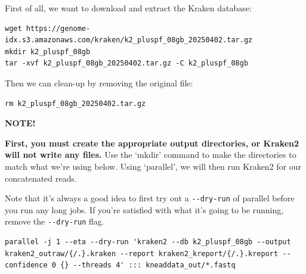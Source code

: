 \documentclass[
]{book}
\newenvironment{greenbox}{
  \definecolor{shadecolor}{RGB}{141, 181, 128}
  \color{white}
  \begin{shaded}}
 {\end{shaded}}
\begin{document}
First of all, we want to download and extract the Kraken database:

\begin{verbatim}
wget https://genome-idx.s3.amazonaws.com/kraken/k2_pluspf_08gb_20250402.tar.gz
mkdir k2_pluspf_08gb
tar -xvf k2_pluspf_08gb_20250402.tar.gz -C k2_pluspf_08gb
\end{verbatim}

Then we can clean-up by removing the original file:

\begin{verbatim}
rm k2_pluspf_08gb_20250402.tar.gz
\end{verbatim}

\begin{greenbox}

\begin{center}
\textbf{NOTE!}

\end{center}

\textbf{First, you must create the appropriate output directories, or Kraken2 will not write any files.} Use the `mkdir' command to make the directories to match what we're using below. Using `parallel', we will then run Kraken2 for our concatenated reads.

\end{greenbox}

Note that it's always a good idea to first try out a \texttt{-\/-dry-run} of parallel before you run any long jobs. If you're satisfied with what it's going to be running, remove the \texttt{-\/-dry-run} flag.

\begin{verbatim}
parallel -j 1 --eta --dry-run 'kraken2 --db k2_pluspf_08gb --output kraken2_outraw/{/.}.kraken --report kraken2_kreport/{/.}.kreport --confidence 0 {} --threads 4' ::: kneaddata_out/*.fastq
\end{verbatim}
\end{document}
